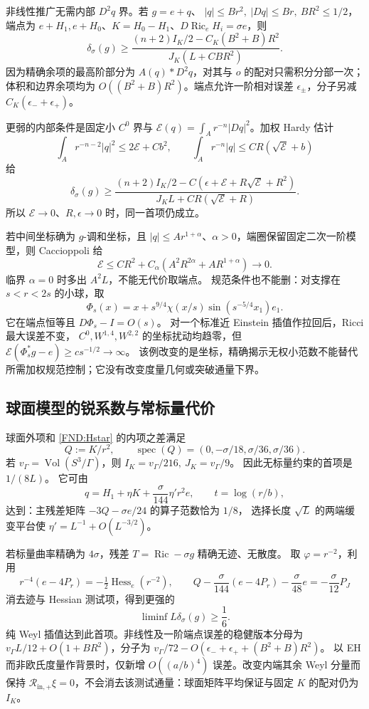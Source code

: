 \documentclass[UTF8,fontset=fandol,zihao=-4,oneside,openany]{ctexbook}
\theoremstyle{cjkplain}
\numberwithin{equation}{chapter}
\DeclareMathOperator{\Ric}{Ric}
\DeclareMathOperator{\Vol}{Vol}
\begin{document}
非线性推广无需内部 \(D^2q\) 界。若 \(g=e+q\)、
\(|q|\le Br^2,\ |Dq|\le Br,\ BR^2\le1/2\)，端点为
\(e+H_1,e+H_0\)、\(K=H_0-H_1\)、\(D\Ric_eH_i=\sigma e\)，则
\begin{equation}\label{FND:nonlinearflux}
\delta_\sigma(g)\ge
\frac{(n+2)I_K/2-C_K(B^2+B)R^2}
{J_K(L+CBR^2)} .
\end{equation}
因为精确余项的最高阶部分为 \(A(q)*D^2q\)，对其与 \(o\) 的配对只需积分分部一次；体积和边界余项均为 \(O((B^2+B)R^2)\)。端点允许一阶相对误差 \(\epsilon_\pm\)，分子另减 \(C_K(\epsilon_-+\epsilon_+)\)。

更弱的内部条件是固定小 \(C^0\) 界与
\(\mathcal E(q)=\int_A r^{-n}|Dq|^2\)。加权 Hardy 估计
\[
\int_A r^{-n-2}|q|^2\le2\mathcal E+Cb^2,\qquad
\int_A r^{-n}|q|\le CR(\sqrt{\mathcal E}+b)
\]
给
\begin{equation}\label{FND:energyflux}
\delta_\sigma(g)\ge
\frac{(n+2)I_K/2-C(\epsilon+\mathcal E+R\sqrt{\mathcal E}+R^2)}
{J_KL+CR(\sqrt{\mathcal E}+R)} .
\end{equation}
所以 \(\mathcal E\to0\)、\(R,\epsilon\to0\) 时，同一首项仍成立。

若中间坐标确为 \(g\)-调和坐标，且 \(|q|\le Ar^{1+\alpha}\)、\(\alpha>0\)，端圈保留固定二次一阶模型，则 Caccioppoli 给
\[
\mathcal E\le CR^2+C_\alpha
(A^2R^{2\alpha}+AR^{1+\alpha})\to0 .
\]
临界 \(\alpha=0\) 时多出 \(A^2L\)，不能无代价取端点。
规范条件也不能删：对支撑在 \(s<r<2s\) 的小球，取
\[
\Phi_s(x)=x+s^{9/4}\chi(x/s)
\sin(s^{-5/4}x_1)e_1 .
\]
它在端点恒等且 \(D\Phi_s-I=O(s)\)。
对一个标准近 Einstein 插值作拉回后，Ricci 最大误差不变，
\(C^0,W^{1,4},W^{2,2}\) 的坐标扰动均趋零，但
\(\mathcal E(\Phi_s^*g-e)\ge cs^{-1/2}\to\infty\)。
该例改变的是坐标，精确揭示无权小范数不能替代所需加权规范控制；它没有改变度量几何或突破通量下界。

\subsection{球面模型的锐系数与常标量代价}
球面外项和 \eqref{FND:Hstar} 的内项之差满足
\[
Q:=K/r^2,\qquad
\operatorname{spec}(Q)=(0,-\sigma/18,\sigma/36,\sigma/36).
\]
若 \(v_\Gamma=\Vol(S^3/\Gamma)\)，则
\(I_K=v_\Gamma/216,\ J_K=v_\Gamma/9\)。
因此无标量约束的首项是 \(1/(8L)\)。
它可由
\[
q=H_1+\eta K+\frac{\sigma}{144}\eta' r^2e,\qquad t=\log(r/b),
\]
达到：主残差矩阵
\(-3Q-\sigma e/24\) 的算子范数恰为 \(1/8\)，
选择长度 \(\sqrt L\) 的两端缓变平台使
\(\eta'=L^{-1}+O(L^{-3/2})\)。

若标量曲率精确为 \(4\sigma\)，残差 \(T=\Ric-\sigma g\) 精确无迹、无散度。
取 \(\varphi=r^{-2}\)，利用
\[
r^{-4}(e-4P_r)=-\tfrac12\operatorname{Hess}_e(r^{-2}),\qquad
Q-\frac{\sigma}{144}(e-4P_r)-\frac{\sigma}{48}e
=-\frac{\sigma}{12}P_J
\]
消去迹与 Hessian 测试项，得到更强的
\[
\liminf L\delta_\sigma(g)\ge\frac16 .
\]
纯 Weyl 插值达到此首项。非线性及一阶端点误差的稳健版本分母为
\(v_\Gamma L/12+O(1+BR^2)\)，分子为
\(v_\Gamma/72-O(\epsilon_-+\epsilon_++(B^2+B)R^2)\)。
以 EH 而非欧氏度量作背景时，仅新增 \(O((a/b)^4)\) 误差。改变内端其余 Weyl 分量而保持
\(\mathcal R_{\mathrm{in},+}\xi=0\)，不会消去该测试通量：球面矩阵平均保证与固定 \(K\) 的配对仍为 \(I_K\)。
\end{document}
